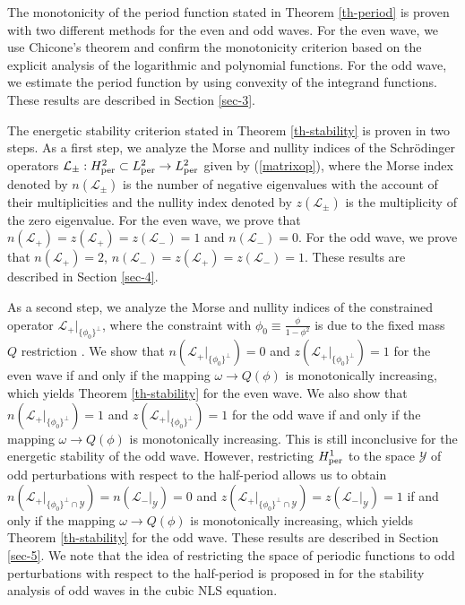 \documentclass[12pt,reqno]{amsart}
\numberwithin{equation}{section}
\numberwithin{figure}{section}
\begin{document}
The monotonicity of the period function stated in Theorem \ref{th-period} is proven with two different methods for the even and odd waves. For the even wave, 
we use Chicone's theorem \cite{chicone2} and confirm the monotonicity criterion 
based on the explicit analysis of the logarithmic and polynomial functions. 
For the odd wave, we estimate the period function by using convexity of the integrand functions. These results are described in Section \ref{sec-3}.

The energetic stability criterion stated in Theorem \ref{th-stability} 
is proven in two steps. 
As a first step, we analyze the Morse and nullity indices 
of the Schr\"{o}dinger operators $\mathcal{L}_{\pm} : H^2_{\rm per} \subset L^2_{\rm per} \to L^2_{\rm per}$ given by (\ref{matrixop}), where 
the Morse index denoted by $n(\mathcal{L}_{\pm})$ is the number of negative eigenvalues with the account of their multiplicities and the nullity index 
denoted by $z(\mathcal{L}_{\pm})$ is the multiplicity of the zero eigenvalue. 
For the even wave, we prove that $n(\mathcal{L}_+) = z(\mathcal{L}_+) = z(\mathcal{L}_-) = 1$ and $n(\mathcal{L}_-) = 0$. For the odd wave, 
we prove that $n(\mathcal{L}_+) = 2$, $n(\mathcal{L}_-) = z(\mathcal{L}_+) = z(\mathcal{L}_-) = 1$. These results are described in Section \ref{sec-4}.

As a second step, we analyze the Morse and nullity indices 
of the constrained operator $\mathcal{L}_+ |_{\{ \phi_0 \}^{\perp}}$, where 
the constraint with $\phi_0 \equiv \frac{\phi}{1- \phi^2}$ is due to the fixed mass $Q$ restriction \cite{GeyerPel25}. We show that $n(\mathcal{L}_+ |_{\{ \phi_0 \}^{\perp}}) = 0$ and $z(\mathcal{L}_+ |_{\{ \phi_0 \}^{\perp}}) = 1$ 
for the even wave if and only if the mapping $\omega \to Q(\phi)$ is monotonically 
increasing, which yields Theorem \ref{th-stability} for the even wave. 
We also show that $n(\mathcal{L}_+ |_{\{ \phi_0 \}^{\perp}}) = 1$ and $z(\mathcal{L}_+ |_{\{ \phi_0 \}^{\perp}}) = 1$ 
for the odd wave if and only if the mapping $\omega \to Q(\phi)$ is monotonically 
increasing. This is still inconclusive for the energetic stability of the odd wave. However, restricting $H^1_{\rm per}$ to the space $\mathcal{Y}$ of odd perturbations 
with respect to the half-period allows us to obtain 
$n(\mathcal{L}_+ |_{\{ \phi_0 \}^{\perp} \cap \mathcal{Y}}) = 
n(\mathcal{L}_- |_{\mathcal{Y}}) = 0$ and 
$z(\mathcal{L}_+ |_{\{ \phi_0 \}^{\perp} \cap \mathcal{Y}}) = 
z(\mathcal{L}_- |_{\mathcal{Y}}) = 1$ 
if and only if the mapping $\omega \to Q(\phi)$ is monotonically 
increasing, which yields Theorem \ref{th-stability} for the odd wave. These results are described in Section \ref{sec-5}. We note that the idea of restricting the space of periodic functions to odd perturbations with respect to the half-period is proposed in \cite{GalHar} for the stability analysis of odd waves in the cubic NLS equation.
\end{document}
